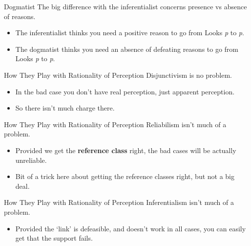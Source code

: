 \documentclass[
  17pt,
  letterpaper,
  ignorenonframetext,
  aspectratio=169,
  handout,
  xcolor={dvipsnames}]{beamer}
\providecommand{\tightlist}{%
  \setlength{\itemsep}{0pt}\setlength{\parskip}{0pt}}\usepackage{longtable,booktabs,array}
\begin{document}
\begin{frame}{Dogmatist}
\protect\hypertarget{dogmatist-1}{}
The big difference with the inferentialist concerns presence vs absence
of reasons.

\begin{itemize}[<+->]
\tightlist
\item
  The inferentialist thinks you need a positive reason to go from Looks
  \emph{p} to \emph{p}.
\item
  The dogmatist thinks you need an absence of defeating reasons to go
  from Looks \emph{p} to \emph{p}.
\end{itemize}
\end{frame}

\begin{frame}{How They Play with Rationality of Perception}
\protect\hypertarget{how-they-play-with-rationality-of-perception}{}
Disjunctivism is no problem.

\begin{itemize}[<+->]
\tightlist
\item
  In the bad case you don't have real perception, just apparent
  perception.
\item
  So there isn't much charge there.
\end{itemize}
\end{frame}

\begin{frame}{How They Play with Rationality of Perception}
\protect\hypertarget{how-they-play-with-rationality-of-perception-1}{}
Reliabilism isn't much of a problem.

\begin{itemize}[<+->]
\tightlist
\item
  Provided we get the \textbf{reference class} right, the bad cases will
  be actually unreliable.
\item
  Bit of a trick here about getting the reference classes right, but not
  a big deal.
\end{itemize}
\end{frame}

\begin{frame}{How They Play with Rationality of Perception}
\protect\hypertarget{how-they-play-with-rationality-of-perception-2}{}
Inferentialism isn't much of a problem.

\begin{itemize}[<+->]
\tightlist
\item
  Provided the `link' is defeasible, and doesn't work in all cases, you
  can easily get that the support fails.
\end{itemize}
\end{frame}
\end{document}
